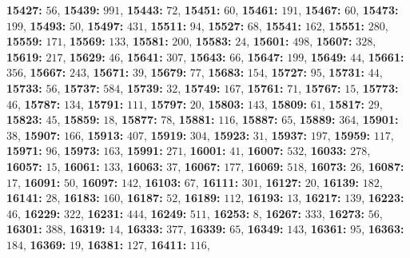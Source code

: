 \textsf{\bfseries 15427:} $56$, \textsf{\bfseries 15439:} $991$, \textsf{\bfseries 15443:} $72$, \textsf{\bfseries 15451:} $60$, \textsf{\bfseries 15461:} $191$, \textsf{\bfseries 15467:} $60$, \textsf{\bfseries 15473:} $199$, \textsf{\bfseries 15493:} $50$, \textsf{\bfseries 15497:} $431$, \textsf{\bfseries 15511:} $94$, \textsf{\bfseries 15527:} $68$, \textsf{\bfseries 15541:} $162$, \textsf{\bfseries 15551:} $280$, \textsf{\bfseries 15559:} $171$, \textsf{\bfseries 15569:} $133$, \textsf{\bfseries 15581:} $200$, \textsf{\bfseries 15583:} $24$, \textsf{\bfseries 15601:} $498$, \textsf{\bfseries 15607:} $328$, \textsf{\bfseries 15619:} $217$, \textsf{\bfseries 15629:} $46$, \textsf{\bfseries 15641:} $307$, \textsf{\bfseries 15643:} $66$, \textsf{\bfseries 15647:} $199$, \textsf{\bfseries 15649:} $44$, \textsf{\bfseries 15661:} $356$, \textsf{\bfseries 15667:} $243$, \textsf{\bfseries 15671:} $39$, \textsf{\bfseries 15679:} $77$, \textsf{\bfseries 15683:} $154$, \textsf{\bfseries 15727:} $95$, \textsf{\bfseries 15731:} $44$, \textsf{\bfseries 15733:} $56$, \textsf{\bfseries 15737:} $584$, \textsf{\bfseries 15739:} $32$, \textsf{\bfseries 15749:} $167$, \textsf{\bfseries 15761:} $71$, \textsf{\bfseries 15767:} $15$, \textsf{\bfseries 15773:} $46$, \textsf{\bfseries 15787:} $134$, \textsf{\bfseries 15791:} $111$, \textsf{\bfseries 15797:} $20$, \textsf{\bfseries 15803:} $143$, \textsf{\bfseries 15809:} $61$, \textsf{\bfseries 15817:} $29$, \textsf{\bfseries 15823:} $45$, \textsf{\bfseries 15859:} $18$, \textsf{\bfseries 15877:} $78$, \textsf{\bfseries 15881:} $116$, \textsf{\bfseries 15887:} $65$, \textsf{\bfseries 15889:} $364$, \textsf{\bfseries 15901:} $38$, \textsf{\bfseries 15907:} $166$, \textsf{\bfseries 15913:} $407$, \textsf{\bfseries 15919:} $304$, \textsf{\bfseries 15923:} $31$, \textsf{\bfseries 15937:} $197$, \textsf{\bfseries 15959:} $117$, \textsf{\bfseries 15971:} $96$, \textsf{\bfseries 15973:} $163$, \textsf{\bfseries 15991:} $271$, \textsf{\bfseries 16001:} $41$, \textsf{\bfseries 16007:} $532$, \textsf{\bfseries 16033:} $278$, \textsf{\bfseries 16057:} $15$, \textsf{\bfseries 16061:} $133$, \textsf{\bfseries 16063:} $37$, \textsf{\bfseries 16067:} $177$, \textsf{\bfseries 16069:} $518$, \textsf{\bfseries 16073:} $26$, \textsf{\bfseries 16087:} $17$, \textsf{\bfseries 16091:} $50$, \textsf{\bfseries 16097:} $142$, \textsf{\bfseries 16103:} $67$, \textsf{\bfseries 16111:} $301$, \textsf{\bfseries 16127:} $20$, \textsf{\bfseries 16139:} $182$, \textsf{\bfseries 16141:} $28$, \textsf{\bfseries 16183:} $160$, \textsf{\bfseries 16187:} $52$, \textsf{\bfseries 16189:} $112$, \textsf{\bfseries 16193:} $13$, \textsf{\bfseries 16217:} $139$, \textsf{\bfseries 16223:} $46$, \textsf{\bfseries 16229:} $322$, \textsf{\bfseries 16231:} $444$, \textsf{\bfseries 16249:} $511$, \textsf{\bfseries 16253:} $8$, \textsf{\bfseries 16267:} $333$, \textsf{\bfseries 16273:} $56$, \textsf{\bfseries 16301:} $388$, \textsf{\bfseries 16319:} $14$, \textsf{\bfseries 16333:} $377$, \textsf{\bfseries 16339:} $65$, \textsf{\bfseries 16349:} $143$, \textsf{\bfseries 16361:} $95$, \textsf{\bfseries 16363:} $184$, \textsf{\bfseries 16369:} $19$, \textsf{\bfseries 16381:} $127$, \textsf{\bfseries 16411:} $116$, 
